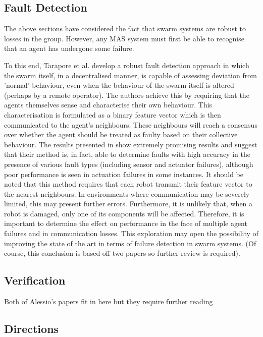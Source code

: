 \documentclass[preprint,8pt]{report}
\begin{document}
\subsection{Fault Detection}

The above sections have considered the fact that swarm systems are robust to losses in the group. However, any MAS system must first be able to recognise that an agent has undergone some failure. 

To this end, Tarapore et al. \cite{Tarapore2019FaultDetection} develop a robust fault detection approach in which the swarm itself, in a decentralised manner, is capable of assessing deviation from 'normal' behaviour, even when the behaviour of the swarm itself is altered (perhaps by a remote operator). The authors achieve this by requiring that the agents themselves sense and characterise their own behaviour. This characterisation is formulated as a binary feature vector which is then communicated to the agent's neighbours. These neighbours will reach a consensus over whether the agent should be treated as faulty based on their collective behaviour. The results presented in \cite{Tarapore2019FaultDetection} show extremely promising results and suggest that their method is, in fact, able to determine faults with high accuracy in the presence of various fault types (including sensor and actuator failures), although poor performance is seen in actuation failures in some instances. It should be noted that this method requires that each robot transmit their feature vector to the nearest neighbours. In environments where communication may be severely limited, this may present further errors. Furthermore, it is unlikely that, when a robot is damaged, only one of its components will be affected. Therefore, it is important to determine the effect on performance in the face of multiple agent failures and in communication losses. This exploration may open the possibility of improving the state of the art in terms of failure detection in swarm systems. (Of course, this conclusion is based off two papers so further review is required).

\subsection{Verification}

Both of Alessio's papers \cite{Kouvaros2019FormalSystems, Lomuscio2019ASystems} fit in here but they require further reading

\subsection{Directions}
\end{document}
